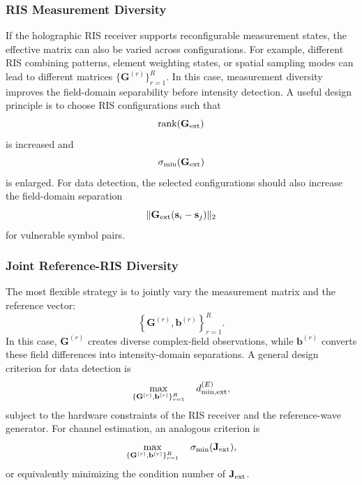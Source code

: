 \documentclass[journal]{IEEEtran}
\begin{document}
\subsubsection{RIS Measurement Diversity}

If the holographic RIS receiver supports reconfigurable measurement states, the effective matrix can also be varied across configurations. 
For example, different RIS combining patterns, element weighting states, or spatial sampling modes can lead to different matrices $\{\mathbf{G}^{(r)}\}_{r=1}^{R}$. 
In this case, measurement diversity improves the field-domain separability before intensity detection. 
A useful design principle is to choose RIS configurations such that
\begin{equation}
\operatorname{rank}(\mathbf{G}_{\rm ext})
\end{equation}
is increased and
\begin{equation}
\sigma_{\min}(\mathbf{G}_{\rm ext})
\end{equation}
is enlarged. 
For data detection, the selected configurations should also increase the field-domain separation
\begin{equation}
\|\mathbf{G}_{\rm ext}(\mathbf{s}_i-\mathbf{s}_j)\|_2
\end{equation}
for vulnerable symbol pairs.

\subsubsection{Joint Reference-RIS Diversity}

The most flexible strategy is to jointly vary the measurement matrix and the reference vector:
\begin{equation}
\left\{
\mathbf{G}^{(r)},\mathbf{b}^{(r)}
\right\}_{r=1}^{R}.
\end{equation}
In this case, $\mathbf{G}^{(r)}$ creates diverse complex-field observations, while $\mathbf{b}^{(r)}$ converts these field differences into intensity-domain separations. 
A general design criterion for data detection is
\begin{equation}
\max_{\{\mathbf{G}^{(r)},\mathbf{b}^{(r)}\}_{r=1}^{R}}
\quad
d_{\min,{\rm ext}}^{(E)},
\label{eq:joint_reference_measurement_design_data}
\end{equation}
subject to the hardware constraints of the RIS receiver and the reference-wave generator. 
For channel estimation, an analogous criterion is
\begin{equation}
\max_{\{\mathbf{G}^{(r)},\mathbf{b}^{(r)}\}_{r=1}^{R}}
\quad
\sigma_{\min}(\mathbf{J}_{\rm ext}),
\label{eq:joint_reference_measurement_design_channel}
\end{equation}
or equivalently minimizing the condition number of $\mathbf{J}_{\rm ext}$.
\end{document}
